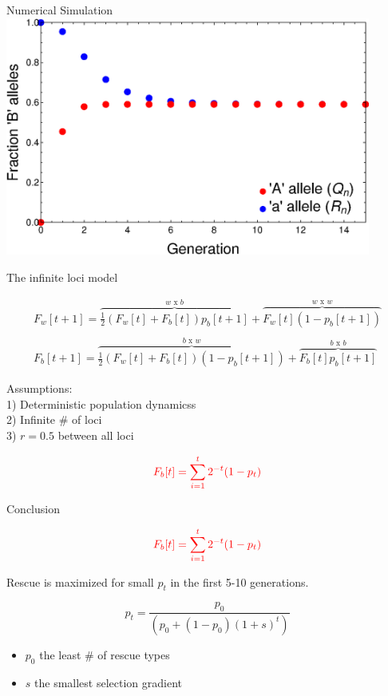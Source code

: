 \documentclass{beamer}
\begin{document}
\begin{frame}{Numerical Simulation}
\includegraphics[width=0.9\textwidth]{Figures/NumericalSolution.eps}

\end{frame}

\begin{frame}{The infinite loci model}

\begin{equation}
    \begin{array}{l}
	F_w[t+1] = \overbrace{\frac{1}{2} (F_w[t]+F_b[t]) p_b[t+1]}^\text{$w$ x $b$}  + \overbrace{F_w[t] (1-p_b[t+1])}^\text{$w$ x $w$}
	 \\ \\
	F_b[t+1]  = \overbrace{\frac{1}{2} (F_w[t]+F_b[t]) (1-p_b[t+1])}^\text{$b$ x $w$} 
	+ \overbrace{F_b[t] p_b[t+1]}^\text{$b$ x $b$}
	\end{array}
\end{equation}

Assumptions: \\
1) Deterministic population dynamicss \\
2) Infinite \# of loci \\
3) $r = 0.5$ between all loci 
    
\begin{equation*}
    \color{red} F_b[t] = \sum_{i=1}^t 2^{-t} (1-p_t)
\end{equation*}
\end{frame}

\begin{frame}{Conclusion}

\begin{equation*}
    \color{red} F_b[t] = \sum_{i=1}^t 2^{-t} (1-p_t)
\end{equation*}

Rescue is maximized for small $p_t$ in the first 5-10 generations.

\begin{equation*}
    p_t = \frac{p_0}{(p_0+(1-p_0) (1+s)^t)}
\end{equation*}

\begin{itemize}
  \item $p_0$   {the least \# of rescue types }
  \item $s$     {the smallest selection gradient}
\end{itemize}

\end{frame}
\end{document}
